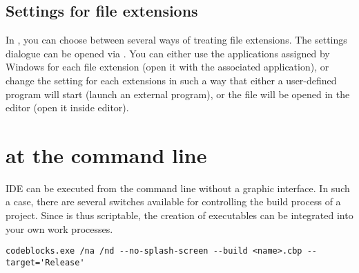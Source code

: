 \subsection{Settings for file extensions}\label{sec:file_extension}

In \codeblocks, you can choose between several ways of treating file extensions. The settings dialogue can be opened via .
You can either use the applications assigned by Windows for each file extension (open it with the associated application), or change the setting for each extensions in such a way that either a user-defined program will start (launch an external program), or the file will be opened in the \codeblocks editor (open it inside \codeblocks editor).


\section{\codeblocks at the command line}

IDE \codeblocks can be executed from the command line without a graphic interface. In such a case, there are several switches available for controlling the build process of a project. Since \codeblocks is thus scriptable, the creation of executables can be integrated into your own work processes.

\begin{lstlisting}
codeblocks.exe /na /nd --no-splash-screen --build <name>.cbp --target='Release'
\end{lstlisting}

